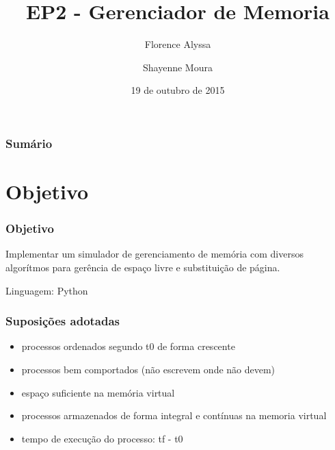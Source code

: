 \documentclass{beamer}
\title{EP2 - Gerenciador de Memoria} %
\author{Florence Alyssa \and Shayenne Moura} %
\institute[USP] %
{
Sistemas Operacionais
 \\ Bacharelado em Ciência da Computação%
\medskip
\textit{} %
}
\date{19 de outubro de 2015} %
\begin{document}
\begin{frame}
\titlepage %
\end{frame}

\begin{frame}
\frametitle{Sumário}

\end{frame}




\section{Objetivo} 

\begin{frame}
\frametitle{Objetivo}
Implementar um simulador de gerenciamento de memória com diversos algorítmos para gerência de espaço livre e substituição de página.

Linguagem: Python
\end{frame}

\begin{frame}
\frametitle{Suposições adotadas}
\begin{itemize}
\item processos ordenados segundo t0 de forma crescente
\item processos bem comportados (não escrevem onde não devem)
\item espaço suficiente na memória virtual
\item processos armazenados de forma integral e contínuas na memoria virtual
\item tempo de execução do processo: tf - t0
\end{itemize}

\end{frame}
\end{document}
